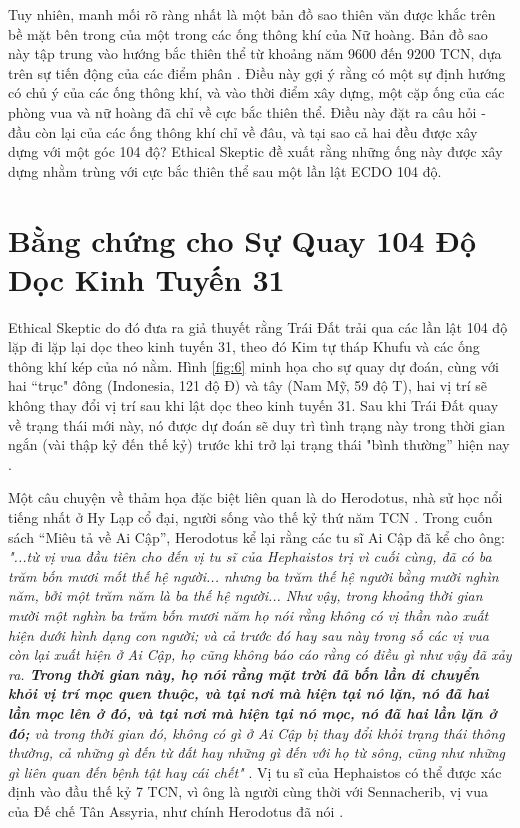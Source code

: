 \documentclass[10pt,twocolumn,letterpaper]{article}
\begin{document}
Tuy nhiên, manh mối rõ ràng nhất là một bản đồ sao thiên văn được khắc trên bề mặt bên trong của một trong các ống thông khí của Nữ hoàng. Bản đồ sao này tập trung vào hướng bắc thiên thể từ khoảng năm 9600 đến 9200 TCN, dựa trên sự tiến động của các điểm phân \cite{28}. Điều này gợi ý rằng có một sự định hướng có chủ ý của các ống thông khí, và vào thời điểm xây dựng, một cặp ống của các phòng vua và nữ hoàng đã chỉ về cực bắc thiên thể. Điều này đặt ra câu hỏi - đầu còn lại của các ống thông khí chỉ về đâu, và tại sao cả hai đều được xây dựng với một góc 104 độ? Ethical Skeptic đề xuất rằng những ống này được xây dựng nhằm trùng với cực bắc thiên thể sau một lần lật ECDO 104 độ.

\section{Bằng chứng cho Sự Quay 104 Độ Dọc Kinh Tuyến 31}

Ethical Skeptic do đó đưa ra giả thuyết rằng Trái Đất trải qua các lần lật 104 độ lặp đi lặp lại dọc theo kinh tuyến 31, theo đó Kim tự tháp Khufu và các ống thông khí kép của nó nằm. Hình \ref{fig:6} minh họa cho sự quay dự đoán, cùng với hai “trục" đông (Indonesia, 121 độ Đ) và tây (Nam Mỹ, 59 độ T), hai vị trí sẽ không thay đổi vị trí sau khi lật dọc theo kinh tuyến 31. Sau khi Trái Đất quay về trạng thái mới này, nó được dự đoán sẽ duy trì tình trạng này trong thời gian ngắn (vài thập kỷ đến thế kỷ) trước khi trở lại trạng thái "bình thường” hiện nay \cite{150}.

Một câu chuyện về thảm họa đặc biệt liên quan là do Herodotus, nhà sử học nổi tiếng nhất ở Hy Lạp cổ đại, người sống vào thế kỷ thứ năm TCN \cite{31}. Trong cuốn sách “Miêu tả về Ai Cập”, Herodotus kể lại rằng các tu sĩ Ai Cập đã kể cho ông: \textit{"...từ vị vua đầu tiên cho đến vị tu sĩ của Hephaistos trị vì cuối cùng, đã có ba trăm bốn mươi mốt thế hệ người... nhưng ba trăm thế hệ người bằng mười nghìn năm, bởi một trăm năm là ba thế hệ người... Như vậy, trong khoảng thời gian mười một nghìn ba trăm bốn mươi năm họ nói rằng không có vị thần nào xuất hiện dưới hình dạng con người; và cả trước đó hay sau này trong số các vị vua còn lại xuất hiện ở Ai Cập, họ cũng không báo cáo rằng có điều gì như vậy đã xảy ra. \textbf{Trong thời gian này, họ nói rằng mặt trời đã bốn lần di chuyển khỏi vị trí mọc quen thuộc, và tại nơi mà hiện tại nó lặn, nó đã hai lần mọc lên ở đó, và tại nơi mà hiện tại nó mọc, nó đã hai lần lặn ở đó;} và trong thời gian đó, không có gì ở Ai Cập bị thay đổi khỏi trạng thái thông thường, cả những gì đến từ đất hay những gì đến với họ từ sông, cũng như những gì liên quan đến bệnh tật hay cái chết"} \cite{32}. Vị tu sĩ của Hephaistos có thể được xác định vào đầu thế kỷ 7 TCN, vì ông là người cùng thời với Sennacherib, vị vua của Đế chế Tân Assyria, như chính Herodotus đã nói \cite{32,33,34}.
\end{document}
